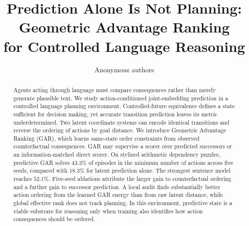 \documentclass{article}
\title{Prediction Alone Is Not Planning:\\Geometric Advantage Ranking\\for Controlled Language Reasoning}
\author{Anonymous authors}
\begin{document}
\maketitle

\begin{abstract}
Agents acting through language must compare consequences rather than merely generate plausible text. We study action-conditioned joint-embedding prediction in a controlled language planning environment. Controlled-future equivalence defines a state sufficient for decision making, yet accurate transition prediction leaves its metric underdetermined. Two latent coordinate systems can encode identical transitions and reverse the ordering of actions by goal distance. We introduce Geometric Advantage Ranking (GAR), which learns same-state order constraints from observed counterfactual consequences. GAR may supervise a scorer over predicted successors or an information-matched direct scorer. On stylized arithmetic dependency puzzles, predictive GAR solves $43.3\%$ of episodes in the minimum number of actions across five seeds, compared with $18.3\%$ for latent prediction alone. The strongest sentence model reaches $52.1\%$. Five-seed ablations attribute the larger gain to counterfactual ordering and a further gain to successor prediction. A local audit finds substantially better action ordering from the learned GAR energy than from raw latent distance, while global effective rank does not track planning. In this environment, predictive state is a viable substrate for reasoning only when training also identifies how action consequences should be ordered.
\end{abstract}












\appendix




\end{document}
